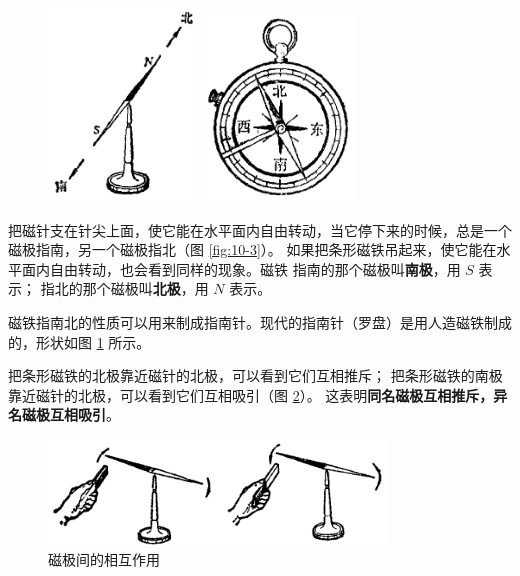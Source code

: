 \begin{figure}[htbp]
    \centering
    \begin{minipage}{7cm}
    \centering
    \includegraphics[width=4cm]{../pic/czwl2-ch10-3}
    \caption{}\label{fig:10-3}
    \end{minipage}
    \qquad
    \begin{minipage}{7cm}
    \centering
    \includegraphics[width=4cm]{../pic/czwl2-ch10-4}
    \caption{}\label{fig:10-4}
    \end{minipage}
\end{figure}

把磁针支在针尖上面，使它能在水平面内自由转动，当它停下来的时候，总是一个磁极指南，另一个磁极指北（图 \ref{fig:10-3}）。
如果把条形磁铁吊起来，使它能在水平面内自由转动，也会看到同样的现象。磁铁
指南的那个磁极叫\textbf{南极}，用 $S$ 表示；
指北的那个磁极叫\textbf{北极}，用 $N$ 表示。


磁铁指南北的性质可以用来制成指南针。现代的指南针（罗盘）是用人造磁铁制成的，形状如图 \ref{fig:10-4} 所示。

把条形磁铁的北极靠近磁针的北极，可以看到它们互相推斥；
把条形磁铁的南极靠近磁针的北极，可以看到它们互相吸引（图 \ref{fig:10-5}）。
这表明\textbf{同名磁极互相推斥，异名磁极互相吸引}。

\begin{figure}[htbp]
    \centering
    \includegraphics[width=0.8\textwidth]{../pic/czwl2-ch10-5}
    \caption{磁极间的相互作用}\label{fig:10-5}
\end{figure}


